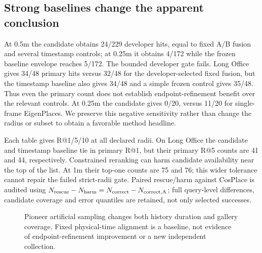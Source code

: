 \documentclass[conference,letterpaper]{IEEEtran}
\begin{document}
\subsection{Strong baselines change the apparent conclusion}
At 0.5m the candidate obtains 24/229 developer hits, equal to fixed A/B fusion and several timestamp controls; at 0.25m it obtains 4/172 while the frozen baseline envelope reaches 5/172. The bounded developer gate fails. Long Office gives 34/48 primary hits versus 32/48 for the developer-selected fixed fusion, but the timestamp baseline also gives 34/48 and a simple frozen control gives 35/48. Thus even the primary count does not establish endpoint-refinement benefit over the relevant controls. At 0.25m the candidate gives 0/20, versus 11/20 for single-frame EigenPlaces. We preserve this negative sensitivity rather than change the radius or subset to obtain a favorable method headline.

Each table gives R@1/5/10 at all declared radii. On Long Office the candidate and timestamp baseline tie in primary R@1, but their primary R@5 counts are 41 and 44, respectively. Constrained reranking can harm candidate availability near the top of the list. At 1m their top-one counts are 75 and 76; this wider tolerance cannot repair the failed strict-radii gate. Paired rescue/harm against CosPlace is audited using $N_{\rm rescue}-N_{\rm harm}=N_{\rm correct}-N_{\rm correct,A}$; full query-level differences, candidate coverage and error quantiles are retained, not only selected successes.

\begin{figure}[t]\centering
{}
\caption{Pioneer artificial sampling changes both history duration and gallery coverage. Fixed physical-time alignment is a baseline, not evidence of endpoint-refinement improvement or a new independent collection.}\label{fig:sampling}\end{figure}
\end{document}
